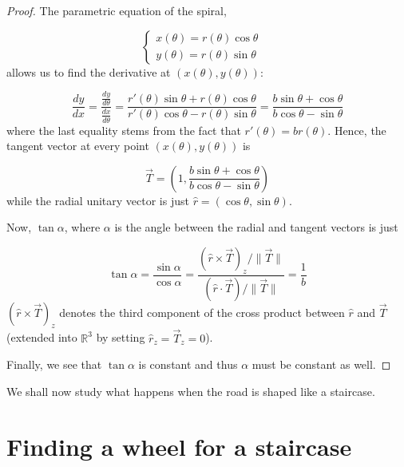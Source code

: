 \documentclass{article}
\theoremstyle{theorem}
\theoremstyle{theorem}
\begin{document}
\begin{proof}


  The parametric equation of the spiral,

\begin{equation}
  \left \lbrace
    \begin{array}{l}
      x(\theta)=r(\theta) \cos \theta \\
      y(\theta)=r(\theta) \sin \theta
    \end{array}
  \right. \quad
\end{equation}
allows us to find the derivative at $\left(x(\theta),
  y(\theta)\right)$:

\begin{equation}
  \frac{dy}{dx}
  =\frac{\frac{dy}{d\theta}}{\frac{dx}{d\theta}}
  =\frac{r'(\theta)\sin\theta+r(\theta)\cos\theta}{r'(\theta)\cos\theta-r(\theta)\sin\theta}
  =\frac{b\sin\theta+\cos\theta}{b\cos\theta-\sin\theta}
\end{equation}
where the last equality stems from the fact that $r'(\theta)=b
r(\theta)$.  Hence, the tangent vector at every point
$\left(x(\theta),y(\theta)\right)$ is

\begin{equation}
  \vec{T}=\left(1, \frac{b\sin\theta+\cos\theta}{b\cos\theta-\sin\theta}\right)
\end{equation}
while the radial unitary vector is just
$\hat{r}=(\cos\theta,\sin\theta)$.



Now, $\tan\alpha$, where $\alpha$ is the angle between the radial and
tangent vectors is just

\begin{equation}
  \tan\alpha
  =\frac{\sin\alpha}{\cos\alpha}
  =\frac{\left(\hat{r}\times\vec{T}\right)_z/\|\vec{T}\|}{\left(\hat{r}\cdot\vec{T}\right)/\|\vec{T}\|}
  =\frac{1}{b}
\end{equation}
$\left(\hat{r}\times\vec{T}\right)_z$ denotes the third component of
the cross product between $\hat{r}$ and $\vec{T}$ (extended into
$\mathbb{R}^3$ by setting $\hat{r}_z=\vec{T}_z=0$).

Finally, we see that $\tan\alpha$ is constant and thus $\alpha$ must
be constant as well.

\end{proof}

We shall now study what happens when the road is shaped like a
staircase.

\section{Finding a wheel for a staircase}
\label{sec:staircases}
\end{document}
